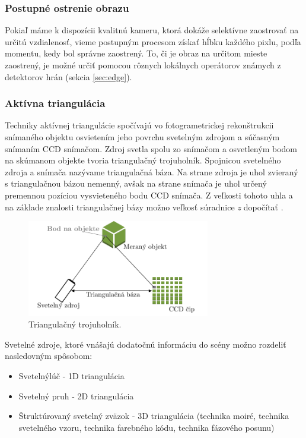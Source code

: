 \subsubsection{Postupné ostrenie obrazu }
Pokiaľ máme k dispozícii kvalitnú kameru, ktorá dokáže selektívne zaostrovať na určitú vzdialenosť, vieme postupným procesom získať hĺbku každého pixlu, podľa momentu, kedy bol správne zaostrený. To, či je obraz na určitom mieste zaostrený, je možné určiť pomocou rôznych lokálnych operátorov známych z detektorov hrán (sekcia \ref{sec:edge}). 


\subsubsection{Aktívna triangulácia }
\label{sec:activeDeep}
Techniky aktívnej triangulácie spočívajú vo fotogrametrickej rekonštrukcii snímaného objektu osvietením jeho povrchu svetelným zdrojom a súčasným snímaním CCD snímačom. Zdroj svetla spolu zo snímačom a osvetleným bodom na skúmanom objekte tvoria triangulačný trojuholník. Spojnicou svetelného zdroja a snímača nazývame triangulačná báza. Na strane zdroja je uhol zvieraný s triangulačnou bázou nemenný, avšak na strane snímača je uhol určený premennou pozíciou vysvieteného bodu CCD snímača. Z veľkosti tohoto uhla a na základe znalosti triangulačnej bázy možno veľkosť súradnice \textit{z} dopočítať \cite{opticke_metody_merania}.

 \begin{figure}[H]
\begin{center}
    \includegraphics[width=8cm]{images/activTriang}
    \caption{Triangulačný trojuholník.}
	\end{center}
\end{figure}

  

Svetelné zdroje, ktoré vnášajú dodatočnú informáciu do scény možno rozdeliť nasledovným spôsobom: 
\begin{itemize}
\item Svetelnýlúč - 1D triangulácia 
\item Svetelný pruh - 2D triangulácia 
\item Štruktúrovaný svetelný zväzok - 3D triangulácia (technika moiré, technika svetelného vzoru, technika farebného kódu, technika fázového posunu) 
\end{itemize}

